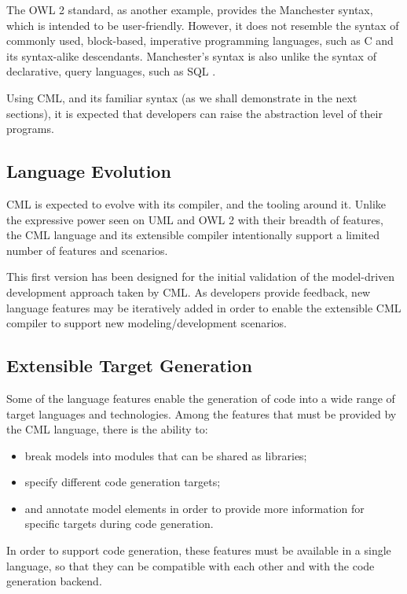 The OWL 2 standard, as another example, provides the Manchester \cite{owl2manchester} syntax,
which is intended to be user-friendly.
However, it does not resemble the syntax of commonly used, block-based, imperative programming languages,
such as C \cite{clang} and its syntax-alike descendants.
Manchester's syntax is also unlike the syntax of declarative, query languages, such as SQL \cite{sql}.

Using CML,
and its familiar syntax (as we shall demonstrate in the next sections),
it is expected that developers can raise the abstraction level of their programs.

\subsection{Language Evolution}

CML is expected to evolve with its compiler, and the tooling around it.
Unlike the expressive power seen on UML \cite{uml} and OWL 2 \cite{owl2} with their breadth of features,
the CML language and its extensible compiler intentionally support a limited number of features and scenarios.

This first version has been designed for the initial validation of the model-driven development approach taken by CML.
As developers provide feedback,
new language features may be iteratively added in order to enable the extensible CML compiler to support new modeling/development scenarios.

\subsection{Extensible Target Generation}

Some of the language features enable the generation of code into a wide range of target languages and technologies. Among the features that must be provided by the CML language, there is the ability to:

\begin{itemize}
\item break models into modules that can be shared as libraries;
\item specify different code generation targets;
\item and annotate model elements in order to provide more information for specific targets during code generation.
\end{itemize}

In order to support code generation, these features must be available in a single language, so that they can be compatible with each other and with the code generation backend.


